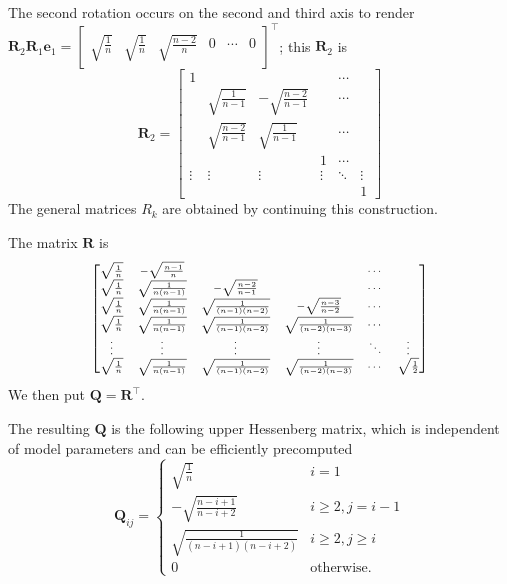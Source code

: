 \documentclass[nohyperref]{article}
\theoremstyle{plain}
\theoremstyle{definition}
\theoremstyle{remark}
\begin{document}
The second rotation 
occurs on the second and third axis to render $\mathbf{R}_2 \mathbf{R}_1 \mathbf{e}_1 = \begin{bmatrix} \sqrt{\frac{1}{n}} & \sqrt{\frac{1}{n}} & \sqrt{\frac{n-2}{n}} & 0 & \cdots & 0 \end{bmatrix}^\top$; this $\mathbf{R}_2$ is
$$
\mathbf{R}_2 = \begin{bmatrix}
1 & & & & \cdots & \\
& \sqrt{\frac{1}{n-1}} & -\sqrt{\frac{n-2}{n-1}} & & \cdots & \\
& \sqrt{\frac{n-2}{n-1}} & \sqrt{\frac{1}{n-1}} & & \cdots & \\
& & & 1 & \cdots & \\
\vdots & \vdots & \vdots & \vdots & \ddots & \vdots \\
& & & & & 1
\end{bmatrix}
$$
The general matrices $R_k$ are obtained by continuing this construction.

The matrix $\mathbf{R}$ is
\begin{equation*}
\begin{scriptsize}
\begin{bmatrix}
\sqrt\frac{1}{n} & -\sqrt{\frac{n-1}{n}} & & & \cdots & \\
\sqrt\frac{1}{n} & \sqrt{\frac{1}{n(n-1)}} & -\sqrt{\frac{n-2}{n-1}} & & \cdots & \\
\sqrt\frac{1}{n} & \sqrt{\frac{1}{n(n-1)}} & \sqrt{\frac{1}{(n-1)(n-2)}} & -\sqrt{\frac{n-3}{n-2}} & \cdots & \\
\sqrt{\frac{1}{n}} & \sqrt{\frac{1}{n(n-1)}} & \sqrt{\frac{1} {(n-1)(n-2)}} & \sqrt{\frac{1}{(n-2)(n-3)}} & \cdots & \\
\vdots & \vdots & \vdots & \vdots & \ddots & \vdots \\
\sqrt{\frac{1}{n}} & \sqrt{\frac{1}{n(n-1)}} & \sqrt{\frac{1}{(n-1)(n-2)}}& \sqrt{\frac{1}{(n-2)(n-3)}} & \cdots & \sqrt{\frac{1}{2}}
\end{bmatrix}
\end{scriptsize}
\end{equation*}
We then put $\mathbf{Q} = \mathbf{R}^\top$.

The resulting $\mathbf{Q}$ is 
the following upper Hessenberg matrix, which is independent of model parameters and can be efficiently precomputed
\begin{equation*}
\mathbf{Q}_{ij} = \begin{cases}
\sqrt{\frac{1}{n}} & i=1 \\
-\sqrt{\frac{n-i+1}{n-i+2}} & i\geq 2, j=i-1 \\
\sqrt{\frac{1}{(n-i+1)(n-i+2)}} & i\geq 2, j\geq i \\
0 & \text{otherwise.}
\end{cases}
\end{equation*}
\end{document}
